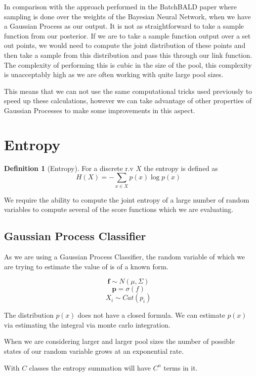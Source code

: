 \documentclass[12pt, a4paper]{report}
\theoremstyle{definition}
\theoremstyle{definition}
\newtheorem{definition}{Definition}[section]
\theoremstyle{definition}
\begin{document}
In comparison with the approach performed in the BatchBALD paper where sampling is done over the weights of the Bayesian Neural Network, when we have a Gaussian Process as our output. It is not as straightforward to take a sample function from our posterior. If we are to take a sample function output over a set out points, we would need to compute the joint distribution of these points and then take a sample from this distribution and pass this through our link function.
The complexity of performing this is cubic in the size of the pool, this complexity is unacceptably high as we are often working with quite large pool sizes.

This means that we can not use the same computational tricks used previously to speed up these calculations, however we can take advantage of other properties of Gaussian Processes to make some improvements in this aspect.


\section{Entropy}
\label{sec:Entropy}

\begin{definition}[Entropy]
    For a discrete r.v $X$ the entropy is defined as $$H(X) = - \sum_{x \in X} p(x) \log p(x) $$
\end{definition}


We require the ability to compute the joint entropy of a large number of random variables to compute several of the score functions which we are evaluating.

\subsection{Gaussian Process Classifier}
As we are using a Gaussian Process Classifier, the random variable of which we are trying to estimate the value of is of a known form.


$$ \mathbf{f} \sim N(\mu, \Sigma) $$
$$ \mathbf{p} =  \sigma \left(f \right) $$
$$ X_i \sim Cat(p_i) $$

The distribution $p(x)$ does not have a closed formula. We can estimate $p(x)$ via estimating the integral via monte carlo integration.

When we are considering larger and larger pool sizes the number of possible states of our random variable grows at an exponential rate.

With $C$ classes the entropy summation will have $C^n$ terms in it. 
\end{document}
